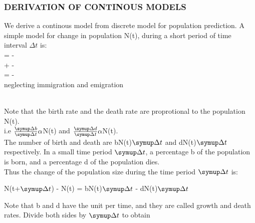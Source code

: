 \documentclass[a4paper,12pt]{report}
\numberwithin{equation}{section}
\begin{document}
\subsubsection{DERIVATION OF CONTINOUS MODELS}
\indent We derive a continous model from discrete model for population prediction. A simple model for change in population N(t), during a short period of time interval $\Delta{t}$ is:\\

=
-
\\

+
-
\\


\Rightarrow
{} 
=
-
\\

neglecting immigration and emigration

\\

Note that the birth rate and the death rate are proprotional to the population N(t).\\
i.e $\frac{\symup\Delta b}{\symup\Delta t} \alpha$N(t) and $\frac{\symup\Delta{d}}{\symup\Delta{t}} \alpha$N(t).\\
The number of birth and death are bN(t)$\symup\Delta{t}$ and dN(t)$\symup\Delta{t}$ respectively. In a small time period $\symup\Delta{t}$, a percentage b of the population is born, and a percentage d of the population dies.\\
Thus the change of the population size during the time period $\symup\Delta{t}$ is:\\
\begin{center}
N(t+$\symup\Delta{t}$) - N(t) = bN(t)$\symup\Delta{t}$ - dN(t)$\symup\Delta{t}$
\end{center}

Note that b and d have the unit per time, and they are called growth and death rates. Divide both sides by $\symup\Delta{t}$ to obtain\\
\end{document}
